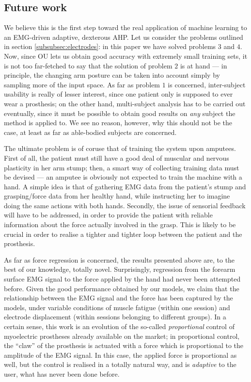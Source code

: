 \subsection*{Future work}

We believe this is the first step toward the real application of
machine learning to an EMG-driven adaptive, dexterous AHP. Let us
consider the problems outlined in section
\ref{subsubsec:electrodes}: in this paper we have solved problems
$3$ and $4$. Now, since OU lets us obtain good accuracy with extremely
small training sets, it is not too far-fetched to say that the
solution of problem $2$ is at hand --- in principle, the changing arm
posture can be taken into account simply by sampling more of the input
space. As far as problem $1$ is concerned, inter-subject usability is
really of lesser interest, since one patient only is supposed to ever
wear a prosthesis; on the other hand, multi-subject analysis has to be
carried out eventually, since it must be possible to obtain good
results on \emph{any} subject the method is applied to. We see no
reason, however, why this should not be the case, at least as far as
able-bodied subjects are concerned.

The ultimate problem is of coruse that of training the system upon
amputees. First of all, the patient must still have a good deal of
muscular and nervous plasticity in her arm stump; then, a smart way of
collecting training data must be devised --- an amputee is obviously
not expected to train the machine with a hand. A simple idea is that
of gathering EMG data from the patient's stump and grasping/force data
from her healthy hand, while instructing her to imagine doing the same
actions with both hands. Secondly, the issue of sensorial feedback
will have to be addressed, in order to provide the patient with
reliable information about the force actually involved in the
grasp. This is likely to be crucial in order to realise a tighter and
tighter loop between the patient and the prosthesis.

As far as force regression is concerned, the results presented above
are, to the best of our knowledge, totally novel. Surprisingly,
regression from the forearm surface EMG signal to the force applied by
the hand had never been attempted before. Given the good performance
obtained by our models, we claim that the relationship between the EMG
signal and the force has been captured by the models, under variable
conditions of muscle fatigue (within one session) and electrode
displacement (within sessions belonging to different groups). In a
certain sense, this work is an evolution of the so-called
\emph{proportional} control of myoelectric prostheses already
available on the market; in proportional control, the ``claw'' of the
prosthesis is actuated with a force which is proportional to the
amplitude of the EMG signal. In this case, the applied force is
proportional as well, but the control is realised in a totally natural
way, and is \emph{adaptive} to the user, what has never been done
before.
